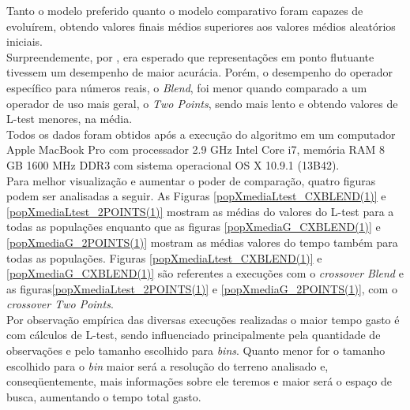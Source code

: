Tanto o modelo preferido quanto o modelo comparativo foram capazes de evoluírem, obtendo valores finais médios superiores aos valores médios aleatórios iniciais.\\

Surpreendemente, por \cite{janikow1991experimental}, era esperado que representações em ponto flutuante tivessem um desempenho de maior acurácia. Porém, o desempenho do operador específico para números reais, o {\it Blend}, foi menor quando comparado a um operador de uso mais geral, o {\it Two Points}, sendo mais lento e obtendo valores de L-test menores, na média.	\\
	
Todos os dados foram obtidos após a execução do algoritmo em um computador Apple MacBook Pro com processador 2.9 GHz Intel Core i7, memória RAM 8 GB 1600 MHz DDR3 com sistema operacional OS X 10.9.1 (13B42).\\



Para melhor visualização e aumentar o poder de comparação, quatro figuras podem ser analisadas a seguir. As Figuras \ref{popXmediaLtest_CXBLEND(1)} e \ref{popXmediaLtest_2POINTS(1)} mostram as médias do valores do L-test para a todas as populações enquanto que as figuras \ref{popXmediaG_CXBLEND(1)} e \ref{popXmediaG_2POINTS(1)} mostram as médias valores do tempo também para todas as populações. Figuras \ref{popXmediaLtest_CXBLEND(1)} e \ref{popXmediaG_CXBLEND(1)} são referentes a execuções com o {\it crossover Blend} e as figuras\ref{popXmediaLtest_2POINTS(1)} e \ref{popXmediaG_2POINTS(1)}, com o {\it crossover Two Points}. \\


Por observação empírica das diversas execuções realizadas o maior tempo gasto é com cálculos de L-test, sendo influenciado principalmente pela quantidade de observações e pelo tamanho escolhido para {\it bins}. Quanto menor for o tamanho escolhido para o {\it bin} maior será a resolução do terreno analisado e, conseqüentemente, mais informações sobre ele teremos e maior será o espaço de busca, aumentando o tempo total gasto.\\

